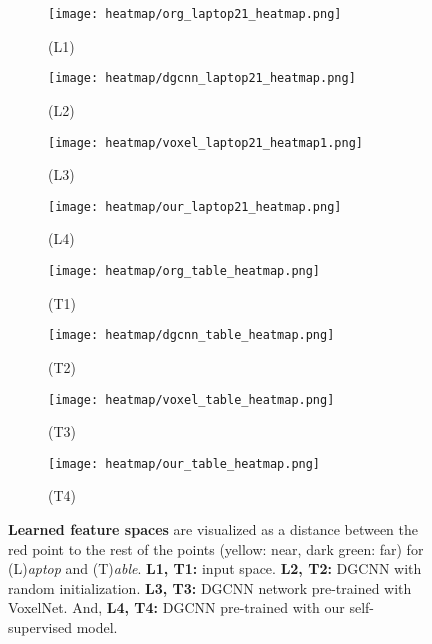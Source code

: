 \documentclass{article}
\begin{document}
\begin{figure}[h]
	\centering
	\begin{subfigure}{.45\textwidth}
		\centering
		\texttt{[image: heatmap/org\_laptop21\_heatmap.png]}
		\caption*{(L1)}
		\label{fig:heat1}
	\end{subfigure}\begin{subfigure}{.45\textwidth}
		\centering
		\texttt{[image: heatmap/dgcnn\_laptop21\_heatmap.png]}
		\caption*{(L2)}
		\label{fig:heat2}
    \end{subfigure}
    \begin{subfigure}{.45\textwidth}
		\centering
		\texttt{[image: heatmap/voxel\_laptop21\_heatmap1.png]}
		\caption*{(L3)}
		\label{fig:heat3}
	\end{subfigure}\begin{subfigure}{.45\textwidth}
		\centering
		\texttt{[image: heatmap/our\_laptop21\_heatmap.png]}
		\caption*{(L4)}
		\label{fig:heat4}
	\end{subfigure}
	\begin{subfigure}{.45\textwidth}
		\centering
		\texttt{[image: heatmap/org\_table\_heatmap.png]}
		\caption*{(T1)}
		\label{fig:heat5}
    \end{subfigure}\begin{subfigure}{.45\textwidth}
		\centering
		\texttt{[image: heatmap/dgcnn\_table\_heatmap.png]}
		\caption*{(T2)}
		\label{fig:heat6}
    \end{subfigure}
    \begin{subfigure}{.45\textwidth}
		\centering
		\texttt{[image: heatmap/voxel\_table\_heatmap.png]}
		\caption*{(T3)}
		\label{fig:heat7}
	\end{subfigure}\begin{subfigure}{.45\textwidth}
		\centering
		\texttt{[image: heatmap/our\_table\_heatmap.png]}
		\caption*{(T4)}
		\label{fig:heat8}
    \end{subfigure}
	\caption{\textbf{Learned feature spaces} are visualized as a distance between the red point to the rest of the points (yellow: near, dark green: far) for (L)\emph{aptop} and (T)\emph{able}. \textbf{L1, T1:} input  space. \textbf{L2, T2:} DGCNN with random initialization. \textbf{L3, T3:} DGCNN network pre-trained with VoxelNet. And, \textbf{L4, T4:} DGCNN pre-trained with our self-supervised model.}
	\label{fig:heatmap_supp2}
\end{figure}    
\end{document}
